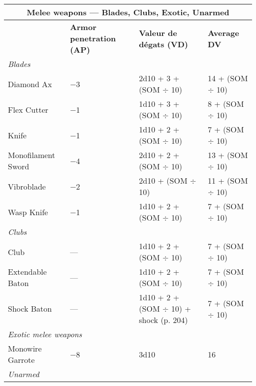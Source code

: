 \begin{table} \begin{tabularx}{\textwidth}{|l|X|l|l|} \hline

\multicolumn{4}{|c|}{\textbf{Melee weapons --- Blades, Clubs, Exotic, Unarmed}} \\ \hline

&\textbf{Armor penetration (AP)}	&\textbf{Valeur de dégats (VD)}	&\textbf{Average DV} \\ \hline

\multicolumn{4}{|l|}{\emph{Blades}} \\ \hline

Diamond Ax	&$-$3	&2d10 + 3 + (SOM $\div$ 10)	&14 + (SOM $\div$ 10) \\ \hline

Flex Cutter	&$-$1	&1d10 + 3 + (SOM $\div$ 10)	&8 + (SOM $\div$ 10) \\ \hline

Knife	&$-$1	&1d10 + 2 + (SOM $\div$ 10)	&7 + (SOM $\div$ 10) \\ \hline

Monofilament Sword	&$-$4	&2d10 + 2 + (SOM $\div$ 10)	&13 + (SOM $\div$ 10) \\ \hline

Vibroblade	&$-$2	&2d10 + (SOM $\div$ 10)	&11 + (SOM $\div$ 10) \\ \hline

Wasp Knife	&$-$1	&1d10 + 2 + (SOM $\div$ 10)	&7 + (SOM $\div$ 10) \\ \hline

\multicolumn{4}{|l|}{\emph{Clubs}} \\ \hline

Club	&--- &1d10 + 2 + (SOM $\div$ 10)	&7 + (SOM $\div$ 10) \\ \hline

Extendable Baton	&--- &1d10 + 2 + (SOM $\div$ 10)	&7 + (SOM $\div$ 10) \\ \hline

Shock Baton	&--- &1d10 + 2 + (SOM $\div$ 10) + shock (p. 204)	&7 + (SOM $\div$ 10) \\ \hline

\multicolumn{4}{|l|}{\emph{Exotic melee weapons}} \\ \hline

Monowire Garrote	&$-$8	&3d10	&16 \\ \hline

\multicolumn{4}{|l|}{\emph{Unarmed}} \\ \hline


\end{tabularx}
\end{table}
